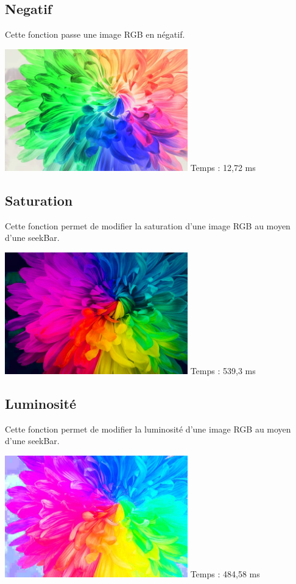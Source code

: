 \documentclass{article}
\begin{document}
\subsection{Negatif}
Cette fonction passe une image RGB en négatif.
\medbreak

\begin{center}
    \medbreak
    \includegraphics[width=300px]{./Images/Multicolor/Negative.jpg}
    \bigbreak
    Temps  : 12,72 ms
\end{center}
\bigbreak

\subsection{Saturation}
Cette fonction permet de modifier la saturation d'une image RGB au moyen d'une seekBar.
\medbreak

\begin{center}
    \medbreak
    \includegraphics[width=300px]{./Images/Multicolor/Saturation_Max.jpg}
    \bigbreak
    Temps  : 539,3 ms
\end{center}
\bigbreak

\subsection{Luminosité}
Cette fonction permet de modifier la luminosité d'une image RGB au moyen d'une seekBar.
\medbreak

\begin{center}
    \medbreak
    \includegraphics[width=300px]{./Images/Multicolor/Brightness_Max.jpg}
    \bigbreak
    Temps  : 484,58 ms
\end{center}
\bigbreak
\end{document}

